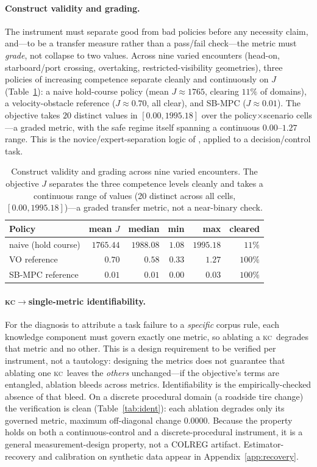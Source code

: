 \documentclass{article}
\newcommand{\kc}{\textsc{kc}}
\begin{document}
\paragraph{Construct validity and grading.} The instrument must separate good from bad policies before
any necessity claim, and---to be a transfer measure rather than a pass/fail check---the metric must
\emph{grade}, not collapse to two values. Across nine varied encounters (head-on, starboard/port
crossing, overtaking, restricted-visibility geometries), three policies of increasing competence
separate cleanly and continuously on $J$ (Table~\ref{tab:construct}): a naive hold-course policy
(mean $J\approx1765$, clearing $11\%$ of domains), a velocity-obstacle reference ($J\approx0.70$, all
clear), and SB-MPC ($J\approx0.01$). The objective takes $20$ distinct values in $[0.00, 1995.18]$
over the policy$\times$scenario cells---a graded metric, with the safe regime itself spanning a
continuous $0.00$--$1.27$ range. This is the novice/expert-separation logic of
\citet{vandongen2007lapsim}, applied to a decision/control task.

\begin{table}[t]
\centering
\small
\begin{tabular}{@{}lrrrrr@{}}
\toprule
Policy & mean $J$ & median & min & max & cleared \\
\midrule
naive (hold course) & $1765.44$ & $1988.08$ & $1.08$ & $1995.18$ & $11\%$ \\
VO reference & $0.70$ & $0.58$ & $0.33$ & $1.27$ & $100\%$ \\
SB-MPC reference & $0.01$ & $0.01$ & $0.00$ & $0.03$ & $100\%$ \\
\bottomrule
\end{tabular}
\caption{Construct validity and grading across nine varied encounters. The objective $J$
separates the three competence levels cleanly and takes a continuous range of values
(20 distinct across all cells, $[0.00, 1995.18]$)---a graded transfer metric, not a near-binary check.}
\label{tab:construct}
\end{table}

\paragraph{\kc$\to$single-metric identifiability.} For the diagnosis to attribute a task failure to a
\emph{specific} corpus rule, each knowledge component must govern exactly one metric, so ablating a
\kc\ degrades that metric and no other. This is a design requirement to be verified per instrument,
not a tautology: designing the metrics does not guarantee that ablating one \kc\ leaves the
\emph{others} unchanged---if the objective's terms are entangled, ablation bleeds across metrics.
Identifiability is the empirically-checked absence of that bleed. On a discrete procedural domain
(a roadside tire change) the verification is clean (Table~\ref{tab:ident}): each ablation degrades only
its governed metric, maximum off-diagonal change $0.0000$. Because the property holds on both a
continuous-control and a discrete-procedural instrument, it is a general measurement-design property,
not a COLREG artifact. Estimator-recovery and calibration on synthetic data appear in
Appendix~\ref{app:recovery}.
\end{document}
